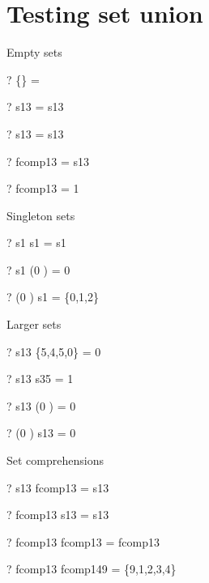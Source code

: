 \documentclass{article}
\begin{document}
\section{Testing set union}
Empty sets
\begin{zed} \vdash?  \{\}      \cup \emptyset   = \emptyset \end{zed}
\begin{zed} \vdash?  \emptyset \cup s13         = s13 \end{zed}
\begin{zed} \vdash?  s13       \cup \emptyset   = s13 \end{zed}
\begin{zed} \vdash?  \emptyset \cup fcomp13     = s13 \end{zed}
\begin{zed} \vdash?  fcomp13   \cup \emptyset   = 1  \end{zed}
Singleton sets
\begin{zed} \vdash?  s1        \cup s1          = s1 \end{zed}
\begin{zed} \vdash?  s1        \cup (0 ) = 0  \end{zed}
\begin{zed} \vdash?  (0 ) \cup s1        = \{0,1,2\} \end{zed}
Larger sets
\begin{zed} \vdash?  s13       \cup \{5,4,5,0\} = 0  \end{zed}
\begin{zed} \vdash?  s13       \cup s35         = 1  \end{zed}
\begin{zed} \vdash?  s13       \cup (0 ) = 0  \end{zed}
\begin{zed} \vdash?  (0 ) \cup s13       = 0  \end{zed}
Set comprehensions
\begin{zed} \vdash?  s13       \cup fcomp13     = s13 \end{zed}
\begin{zed} \vdash?  fcomp13   \cup s13         = s13 \end{zed}
\begin{zed} \vdash?  fcomp13   \cup fcomp13     = fcomp13 \end{zed}
\begin{zed} \vdash?  fcomp13   \cup fcomp149    = \{9,1,2,3,4\} \end{zed}
\end{document}
